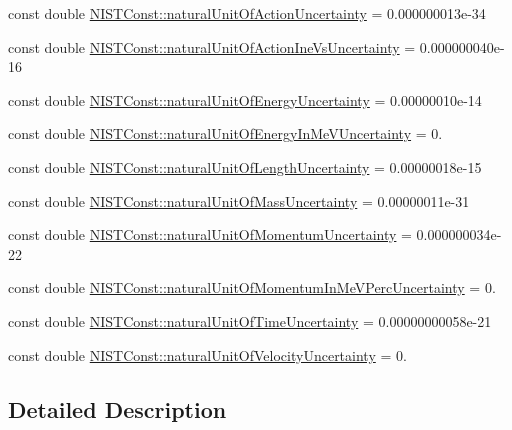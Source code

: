 \begin{DoxyCompactItemize}
\item 
const double \hyperlink{group___n_i_s_t_const-_natural_unit_gab193769ac3b3bf95a370e30b186b0728}{N\+I\+S\+T\+Const\+::natural\+Unit\+Of\+Action\+Uncertainty} = 0.\+000000013e-\/34
\item 
const double \hyperlink{group___n_i_s_t_const-_natural_unit_ga39a2d5e3b25421bb526912e6f464ae4d}{N\+I\+S\+T\+Const\+::natural\+Unit\+Of\+Action\+Ine\+Vs\+Uncertainty} = 0.\+000000040e-\/16
\item 
const double \hyperlink{group___n_i_s_t_const-_natural_unit_ga9d15ef686c79c805b247d0db0807371a}{N\+I\+S\+T\+Const\+::natural\+Unit\+Of\+Energy\+Uncertainty} = 0.\+00000010e-\/14
\item 
const double \hyperlink{group___n_i_s_t_const-_natural_unit_ga7669f513a9dbcb0eb24eca6f9de39f0f}{N\+I\+S\+T\+Const\+::natural\+Unit\+Of\+Energy\+In\+Me\+V\+Uncertainty} = 0.
\item 
const double \hyperlink{group___n_i_s_t_const-_natural_unit_ga84c754daaf83019b7238e8ec133001a6}{N\+I\+S\+T\+Const\+::natural\+Unit\+Of\+Length\+Uncertainty} = 0.\+00000018e-\/15
\item 
const double \hyperlink{group___n_i_s_t_const-_natural_unit_gabf96b874ece35b6b5ada8207d80bab73}{N\+I\+S\+T\+Const\+::natural\+Unit\+Of\+Mass\+Uncertainty} = 0.\+00000011e-\/31
\item 
const double \hyperlink{group___n_i_s_t_const-_natural_unit_ga3a03830abcca1d155f419d616a5b15f0}{N\+I\+S\+T\+Const\+::natural\+Unit\+Of\+Momentum\+Uncertainty} = 0.\+000000034e-\/22
\item 
const double \hyperlink{group___n_i_s_t_const-_natural_unit_ga50e4b860397c307791bc2786590f5291}{N\+I\+S\+T\+Const\+::natural\+Unit\+Of\+Momentum\+In\+Me\+V\+Perc\+Uncertainty} = 0.
\item 
const double \hyperlink{group___n_i_s_t_const-_natural_unit_gabb48c3143ddc02570de65d6fe02a7c7b}{N\+I\+S\+T\+Const\+::natural\+Unit\+Of\+Time\+Uncertainty} = 0.\+00000000058e-\/21
\item 
const double \hyperlink{group___n_i_s_t_const-_natural_unit_ga68827b9e5fea839db077836f3ace3aa5}{N\+I\+S\+T\+Const\+::natural\+Unit\+Of\+Velocity\+Uncertainty} = 0.
\end{DoxyCompactItemize}


\subsection{Detailed Description}


